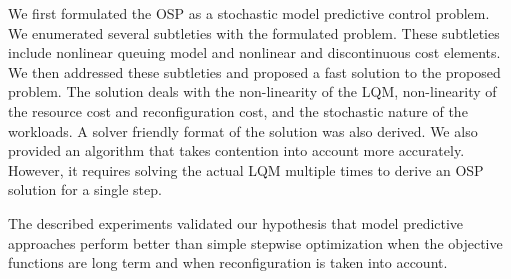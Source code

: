 	We first formulated the OSP as a stochastic model predictive control problem. We enumerated several subtleties with the formulated problem. These subtleties include nonlinear queuing model and nonlinear and discontinuous cost elements. 
	We then addressed these subtleties and proposed a fast solution to the proposed problem. The solution deals with the non-linearity of the LQM, non-linearity of the resource cost and reconfiguration cost, and the stochastic nature of the workloads. A solver friendly format of the solution was also derived. We also provided an algorithm that takes contention into account more accurately. However, it requires solving the actual LQM multiple times to derive an OSP solution for a single step.  
	
		The described experiments validated our hypothesis that model predictive approaches perform better than simple stepwise optimization when the objective functions are long term and when reconfiguration is taken into account. 

